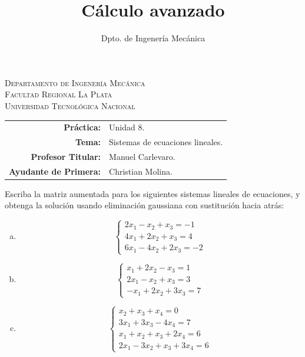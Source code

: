 \documentclass[11pt]{article}
\title{Cálculo avanzado}
\author{Dpto. de Ingenería Mecánica}
\begin{document}

\begin{center}
\end{center}

\begin{center}
	\vspace{\baselineskip}
	\Large{\textsc{Departamento de Ingenería Mecánica}} \\
	\textsc{Facultad Regional La Plata} \\
	\textsc{Universidad Tecnológica Nacional}
\end{center}


\begin{center}
	\begin{tabular}{r l}
		\textbf{Práctica:}            & Unidad 8.                        \\
		\textbf{Tema:}                & Sistemas de ecuaciones lineales. \\
		\textbf{Profesor Titular:}    & Manuel Carlevaro.                \\
		\textbf{Ayudante de Primera:} & Christian Molina.                \\
	\end{tabular}\end{center}

\vspace{1em}

\begin{question} %
	Escriba la matriz aumentada para los siguientes sistemas lineales de ecuaciones, y obtenga la solución usando eliminación gaussiana con sustitución hacia atrás:
	\begin{enumerate}[a)]
		\item \[ \begin{cases}2 x_1 - x_2 + x_3 = -1  \\
				      4 x_1 + 2 x_2 + x_3 = 4 \\
				      6 x_1 - 4 x_2 + 2 x_3 = -2
			      \end{cases} \]
		\item \[ \begin{cases}x_1 + 2 x_2 - x_3 = 1 \\
				      2 x_1 - x_2 + x_3 = 3 \\
				      -x_1 + 2 x_2 + 3 x_3 = 7
			      \end{cases} \]
		\item \[ \begin{cases}x_2 + x_3 + x_4 = 0         \\
				      3 x_1 + 3 x_3 - 4 x_4 = 7   \\
				      x_1 + x_2 + x_3 + 2 x_4 = 6 \\
				      2 x_1 - 3 x_2 + x_3 + 3 x_4 = 6
			      \end{cases} \]
	\end{enumerate}
\end{question}
\end{document}

